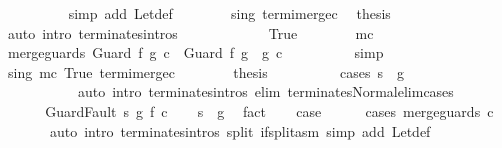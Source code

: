 \begin{isabellebody}
\ \ \ \ \ \ \ \ \isamarkupfalse%
\ {\isacharparenleft}simp\ add{\isacharcolon}\ Let{\isacharunderscore}def{\isacharparenright}\isanewline
\ \ \ \ \ \ \isamarkupfalse%
\ s{\isacharunderscore}in{\isacharunderscore}g\ termi{\isacharunderscore}merge{\isacharunderscore}c\ \isamarkupfalse%
\ {\isacharquery}thesis\isanewline
\ \ \ \ \ \ \ \ \isamarkupfalse%
\ {\isacharparenleft}auto\ intro{\isacharcolon}\ terminates{\isachardot}intros{\isacharparenright}\isanewline
\ \ \ \ \isamarkupfalse%
\isanewline
\ \ \ \ \ \ \isamarkupfalse%
\ True\isanewline
\ \ \ \ \ \ \isamarkupfalse%
\ mc\ \isamarkupfalse%
\ {\isachardoublequoteopen}merge{\isacharunderscore}guards\ {\isacharparenleft}Guard\ f\ g\ c{\isacharparenright}\ {\isacharequal}\ Guard\ f\ {\isacharparenleft}g\ {\isasyminter}\ g{\isacharprime}{\isacharparenright}\ c{\isacharprime}{\isachardoublequoteclose}\isanewline
\ \ \ \ \ \ \ \ \isamarkupfalse%
\ simp\isanewline
\ \ \ \ \ \ \isamarkupfalse%
\ s{\isacharunderscore}in{\isacharunderscore}g\ mc\ True\ termi{\isacharunderscore}merge{\isacharunderscore}c\isanewline
\ \ \ \ \ \ \isamarkupfalse%
\ {\isacharquery}thesis\isanewline
\ \ \ \ \ \ \ \ \isamarkupfalse%
\ {\isacharparenleft}cases\ {\isachardoublequoteopen}s\ {\isasymin}\ g{\isacharprime}{\isachardoublequoteclose}{\isacharparenright}\isanewline
\ \ \ \ \ \ \ \ \ \ \ {\isacharparenleft}auto\ intro{\isacharcolon}\ terminates{\isachardot}intros\ elim{\isacharcolon}\ terminates{\isacharunderscore}Normal{\isacharunderscore}elim{\isacharunderscore}cases{\isacharparenright}\isanewline
\ \ \ \ \isamarkupfalse%
\isanewline
\ \ \isamarkupfalse%
\isanewline
{}\isamarkupfalse%
\isanewline
\ \ \isamarkupfalse%
\ {\isacharparenleft}GuardFault\ s\ g\ f\ c{\isacharparenright}\isanewline
\ \ \isamarkupfalse%
\ {\isachardoublequoteopen}s\ {\isasymnotin}\ g{\isachardoublequoteclose}\ \isamarkupfalse%
\ fact\isanewline
\ \ \isamarkupfalse%
\ {\isacharquery}case\isanewline
\ \ \ \ \isamarkupfalse%
\ {\isacharparenleft}cases\ {\isachardoublequoteopen}merge{\isacharunderscore}guards\ c{\isachardoublequoteclose}{\isacharparenright}\isanewline
\ \ \ \ \ \ \ {\isacharparenleft}auto\ intro{\isacharcolon}\ terminates{\isachardot}intros\ split{\isacharcolon}\ if{\isacharunderscore}split{\isacharunderscore}asm\ simp\ add{\isacharcolon}\ Let{\isacharunderscore}def{\isacharparenright}\isanewline

\end{isabellebody}
